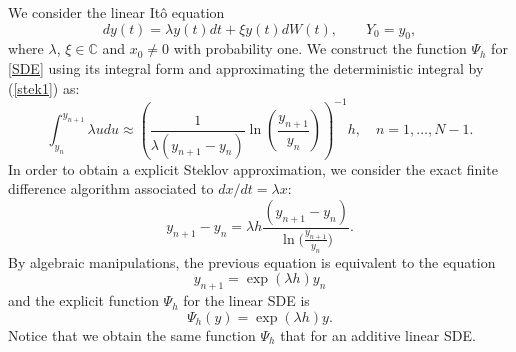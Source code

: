 	\begin{example}\label{subsec31}
		We consider the linear It\^{o} equation  
		\begin{equation}\label{SDE}
			dy(t)=\lambda y(t)dt+\xi y(t) dW(t) , \qquad Y_0=y_0,
		\end{equation}
		where $\lambda$, $\xi \in \mathbb{C}$ and $x_0 \neq 0$ with probability one. We
		construct the function $\Psi_h$ for \eqref{SDE} using its integral form and
		approximating the deterministic integral by (\ref{stek1}) as:
		$$
			\int_{y_n}^{y_{n+1}} \lambda u du\approx
			\left(
			\frac{1}{\lambda(y_{n+1}-y_n)}\mbox{$\ln$}
			\left(
		\frac{y_{n+1}}{y_n}
			\right)
			\right)^{-1}h, \quad n=1,\dots,N-1.
		$$
		In order to obtain a explicit Steklov approximation, we consider the exact finite
		difference algorithm  associated to $dx/dt=\lambda x$:
		\begin{equation*}
			y_{n+1}-y_n=  \lambda h
		\frac{(y_{n+1}-y_n)}{\mbox{$\ln$}\Big(\frac{y_{n+1}}{y_n}\Big)}.
		\end{equation*}
		By algebraic manipulations, the previous equation is equivalent to the equation    
		$$
			y_{n+1}=\mbox{$\exp$}(\lambda h) y_n 
		$$
		and the explicit function $\Psi_h$ for the linear SDE is 
		\begin{equation}\label{psi1}
			\Psi_h(y)= \mbox{$\exp$}(\lambda h) y.
		\end{equation}
		Notice that we obtain the same function $\Psi_h$ that for an additive linear SDE.
	\end{example}
	
